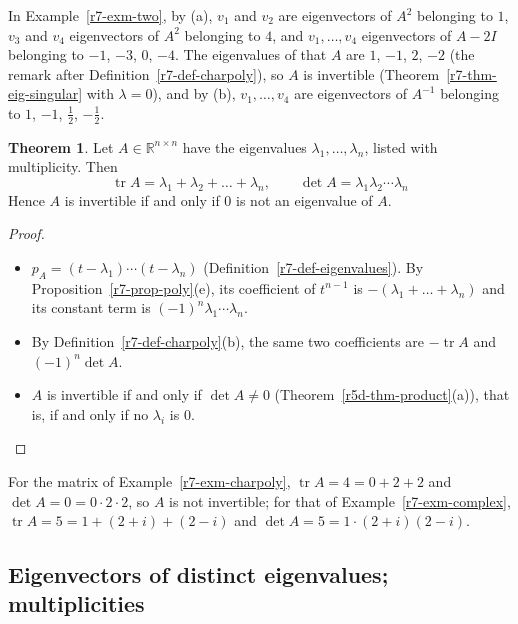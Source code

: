 \documentclass[12pt]{article}
\newcommand{\R}{\mathbb R}
\DeclareMathOperator{\tr}{tr}
\theoremstyle{definition}
\newtheorem{theorem}{Theorem}
\begin{document}
In Example~\ref{r7-exm-two}, by (a), \(v_1\) and \(v_2\) are eigenvectors of \(A^2\) belonging to \(1\), \(v_3\) and
\(v_4\) eigenvectors of \(A^2\) belonging to \(4\), and \(v_1,\dots,v_4\) eigenvectors of \(A-2I\) belonging to \(-1\),
\(-3\), \(0\), \(-4\). The eigenvalues of that \(A\) are \(1\), \(-1\), \(2\), \(-2\) (the remark after
Definition~\ref{r7-def-charpoly}), so \(A\) is invertible (Theorem~\ref{r7-thm-eig-singular} with \(\lambda=0\)), and
by (b), \(v_1,\dots,v_4\) are eigenvectors of \(A^{-1}\) belonging to \(1\), \(-1\), \(\frac12\), \(-\frac12\).

\begin{theorem}\label{r7-thm-trace-det}
Let \(A\in\R^{n\times n}\) have the eigenvalues \(\lambda_1,\dots,\lambda_n\), listed with multiplicity. Then
\[
\tr A=\lambda_1+\lambda_2+\dots+\lambda_n,\qquad\det A=\lambda_1\lambda_2\cdots\lambda_n
\]
Hence \(A\) is invertible if and only if \(0\) is not an eigenvalue of \(A\).
\end{theorem}
\begin{proof}
\begin{itemize}
\item \(p_A=(t-\lambda_1)\cdots(t-\lambda_n)\) (Definition~\ref{r7-def-eigenvalues}). By Proposition~\ref{r7-prop-poly}(e),
its coefficient of \(t^{n-1}\) is \(-(\lambda_1+\dots+\lambda_n)\) and its constant term is \((-1)^n\lambda_1\cdots\lambda_n\).
\item By Definition~\ref{r7-def-charpoly}(b), the same two coefficients are \(-\tr A\) and \((-1)^n\det A\).
\item \(A\) is invertible if and only if \(\det A\ne0\) (Theorem~\ref{r5d-thm-product}(a)), that is, if and only if no
\(\lambda_i\) is \(0\).\qedhere
\end{itemize}
\end{proof}
For the matrix of Example~\ref{r7-exm-charpoly}, \(\tr A=4=0+2+2\) and \(\det A=0=0\cdot2\cdot2\), so \(A\) is not
invertible; for that of Example~\ref{r7-exm-complex}, \(\tr A=5=1+(2+i)+(2-i)\) and \(\det A=5=1\cdot(2+i)(2-i)\).

\subsection*{Eigenvectors of distinct eigenvalues; multiplicities}
\end{document}
